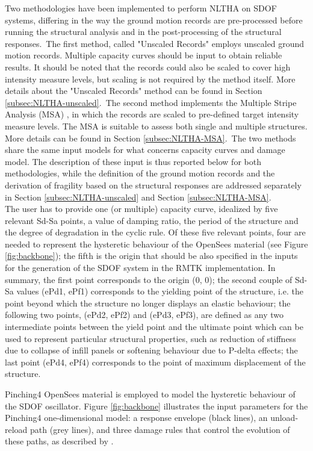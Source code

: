 Two methodologies have been implemented to perform NLTHA on SDOF systems, differing in the way the ground motion records are pre-processed before running the structural analysis and in the post-processing of the structural responses.\
The first method, called "Unscaled Records" employs unscaled ground motion records. Multiple capacity curves should be input to obtain reliable results. It should be noted that the records could also be scaled to cover high intensity measure levels, but scaling is not required by the method itself. More details about the "Unscaled Records" method can be found in Section \ref{subsec:NLTHA-unscaled}.\
The second method implements the Multiple Stripe Analysis (MSA) \citep{Jalayer2003}, in which the records are scaled to pre-defined target intensity measure levels. The MSA is suitable to assess both single and multiple structures. More details can be found in Section \ref{subsec:NLTHA-MSA}.\
The two methods share the same input models for what concerns capacity curves and damage model. The description of these input is thus reported below for both methodologies, while the definition of the ground motion records and the derivation of fragility based on the structural responses are addressed separately in Section \ref{subsec:NLTHA-unscaled} and Section \ref{subsec:NLTHA-MSA}.\\

The user has to provide one (or multiple) capacity curve, idealized by five relevant Sd-Sa points, a value of damping ratio, the period of the structure and the degree of degradation in the cyclic rule. Of these five relevant points, four are needed to represent the hysteretic behaviour of the OpenSees material (see Figure \ref{fig:backbone}); the fifth is the origin that should be also specified in the inputs for the generation of the SDOF system in the RMTK implementation. In summary, the first point corresponds to the origin (0, 0); the second couple of Sd-Sa values (ePd1, ePf1) corresponds to the yielding point of the structure, i.e. the point beyond which the structure no longer displays an elastic behaviour; the following two points, (ePd2, ePf2) and (ePd3, ePf3), are defined as any two intermediate points between the yield point and the ultimate point which can be used to represent particular structural properties, such as reduction of stiffness due to collapse of infill panels or softening behaviour due to P-delta effects; the last point (ePd4, ePf4) corresponds to the point of maximum displacement of the structure.

Pinching4 OpenSees material is employed to model the hysteretic behaviour of the SDOF oscillator. Figure \ref{fig:backbone} illustrates the input parameters for the Pinching4 one-dimensional model: a response envelope (black lines), an unload-reload path (grey lines), and three damage rules that control the evolution of these paths, as described by \citep{LowesEtAl2003}.

